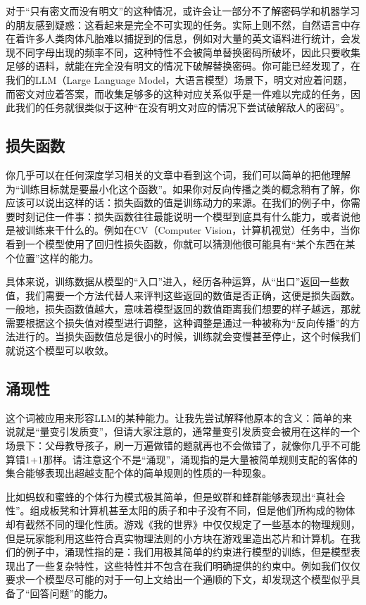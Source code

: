 \documentclass{article}
\begin{document}
对于“只有密文而没有明文”的这种情况，或许会让一部分不了解密码学和机器学习的朋友感到疑惑：这看起来是完全不可实现的任务。实际上则不然，自然语言中存在着许多人类肉体凡胎难以捕捉到的信息，例如对大量的英文语料进行统计，会发现不同字母出现的频率不同，这种特性不会被简单替换密码所破坏，因此只要收集足够的语料，就能在完全没有明文的情况下破解替换密码。你可能已经发现了，在我们的LLM（Large Language Model，大语言模型）场景下，明文对应着问题，而密文对应着答案，而收集足够多的这种对应关系似乎是一件难以完成的任务，因此我们的任务就很类似于这种“在没有明文对应的情况下尝试破解敌人的密码”。

\subsection{损失函数}
你几乎可以在任何深度学习相关的文章中看到这个词，我们可以简单的把他理解为“训练目标就是要最小化这个函数”。如果你对反向传播之类的概念稍有了解，你应该可以说出这样的话：损失函数的值是训练动力的来源。在我们的例子中，你需要时刻记住一件事：损失函数往往最能说明一个模型到底具有什么能力，或者说他是被训练来干什么的。例如在CV（Computer Vision，计算机视觉）任务中，当你看到一个模型使用了回归性损失函数，你就可以猜测他很可能具有“某个东西在某个位置”这样的能力。

具体来说，训练数据从模型的“入口”进入，经历各种运算，从“出口”返回一些数值，我们需要一个方法代替人来评判这些返回的数值是否正确，这便是损失函数。一般地，损失函数值越大，意味着模型返回的数值距离我们想要的样子越远，那就需要根据这个损失值对模型进行调整，这种调整是通过一种被称为“反向传播”的方法进行的。当损失函数值总是很小的时候，训练就会变慢甚至停止，这个时候我们就说这个模型可以收敛。

\subsection{涌现性}
这个词被应用来形容LLM的某种能力。让我先尝试解释他原本的含义：简单的来说就是“量变引发质变”，但请大家注意的，通常量变引发质变会被用在这样的一个场景下：父母教导孩子，刷一万遍做错的题就再也不会做错了，就像你几乎不可能算错1+1那样。请注意这个不是“涌现”，涌现指的是大量被简单规则支配的客体的集合能够表现出超越支配个体的简单规则的性质的一种现象。

比如蚂蚁和蜜蜂的个体行为模式极其简单，但是蚁群和蜂群能够表现出“真社会性”。组成板凳和计算机甚至太阳的质子和中子没有不同，但是他们所构成的物体却有截然不同的理化性质。游戏《我的世界》中仅仅规定了一些基本的物理规则，但是玩家能利用这些符合真实物理法则的小方块在游戏里造出芯片和计算机。在我们的例子中，涌现性指的是：我们用极其简单的约束进行模型的训练，但是模型表现出了一些复杂特性，这些特性并不包含在我们明确提供的约束中。例如我们仅仅要求一个模型尽可能的对于一句上文给出一个通顺的下文，却发现这个模型似乎具备了“回答问题”的能力。
\end{document}

